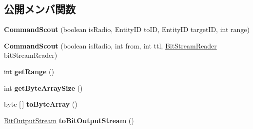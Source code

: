 \subsection*{公開メンバ関数}
\begin{DoxyCompactItemize}
\item 
\hypertarget{classadf_1_1agent_1_1communication_1_1standard_1_1bundle_1_1topdown_1_1CommandScout_ac0a0110b57ef6dbb1974ce6162860868}{}\label{classadf_1_1agent_1_1communication_1_1standard_1_1bundle_1_1topdown_1_1CommandScout_ac0a0110b57ef6dbb1974ce6162860868} 
{\bfseries Command\+Scout} (boolean is\+Radio, Entity\+ID to\+ID, Entity\+ID target\+ID, int range)
\item 
\hypertarget{classadf_1_1agent_1_1communication_1_1standard_1_1bundle_1_1topdown_1_1CommandScout_acdf95a514aa45b155b08d4b250343c9b}{}\label{classadf_1_1agent_1_1communication_1_1standard_1_1bundle_1_1topdown_1_1CommandScout_acdf95a514aa45b155b08d4b250343c9b} 
{\bfseries Command\+Scout} (boolean is\+Radio, int from, int ttl, \hyperlink{classadf_1_1component_1_1communication_1_1util_1_1BitStreamReader}{Bit\+Stream\+Reader} bit\+Stream\+Reader)
\item 
\hypertarget{classadf_1_1agent_1_1communication_1_1standard_1_1bundle_1_1topdown_1_1CommandScout_a3fe1b718a7489349c7680862fa533685}{}\label{classadf_1_1agent_1_1communication_1_1standard_1_1bundle_1_1topdown_1_1CommandScout_a3fe1b718a7489349c7680862fa533685} 
int {\bfseries get\+Range} ()
\item 
\hypertarget{classadf_1_1agent_1_1communication_1_1standard_1_1bundle_1_1topdown_1_1CommandScout_aba829e90611691419d59fd26703eee9b}{}\label{classadf_1_1agent_1_1communication_1_1standard_1_1bundle_1_1topdown_1_1CommandScout_aba829e90611691419d59fd26703eee9b} 
int {\bfseries get\+Byte\+Array\+Size} ()
\item 
\hypertarget{classadf_1_1agent_1_1communication_1_1standard_1_1bundle_1_1topdown_1_1CommandScout_a4108b2f1f5146089d06cadcb5a48b718}{}\label{classadf_1_1agent_1_1communication_1_1standard_1_1bundle_1_1topdown_1_1CommandScout_a4108b2f1f5146089d06cadcb5a48b718} 
byte \mbox{[}$\,$\mbox{]} {\bfseries to\+Byte\+Array} ()
\item 
\hypertarget{classadf_1_1agent_1_1communication_1_1standard_1_1bundle_1_1topdown_1_1CommandScout_ae2b5e99f7919c4a445f6f5aafb8c8cd9}{}\label{classadf_1_1agent_1_1communication_1_1standard_1_1bundle_1_1topdown_1_1CommandScout_ae2b5e99f7919c4a445f6f5aafb8c8cd9} 
\hyperlink{classadf_1_1component_1_1communication_1_1util_1_1BitOutputStream}{Bit\+Output\+Stream} {\bfseries to\+Bit\+Output\+Stream} ()

\end{DoxyCompactItemize}

